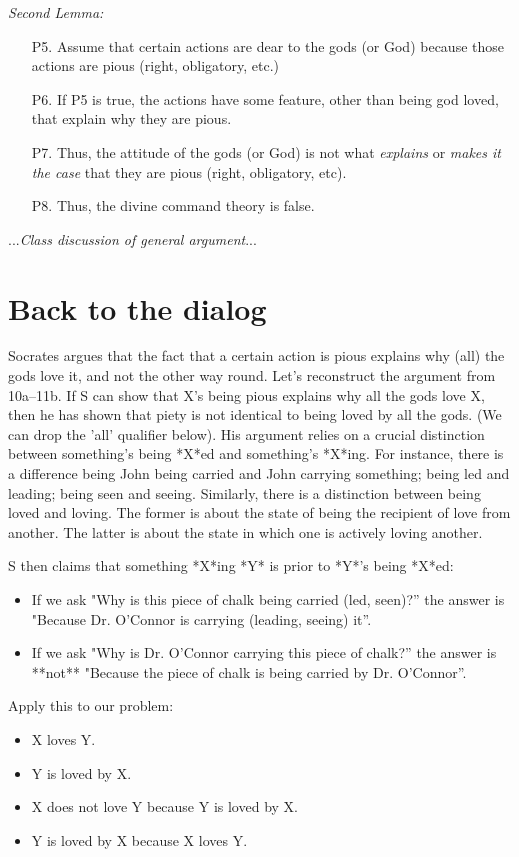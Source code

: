 \documentclass[oneside]{article}
\begin{document}
\begin{description}
\noindent \emph{Second Lemma:}
\begin{enumerate}
\item[P5.] Assume that certain actions are dear to the gods (or God) because those actions are pious (right, obligatory, etc.)
\item[P6.] If P5 is true, the actions have some feature, other than being god loved, that explain why they are pious. 
\item[P7.] Thus,  the attitude of the gods (or God) is not what \emph{explains} or \emph{makes it the case} that they are pious (right, obligatory, etc).
\item[P8.] Thus, the divine command theory is false.
\end{enumerate}
\noindent ...\emph{Class discussion of general argument}...

\section*{Back to the dialog}
\noindent Socrates argues that the fact that a certain action is pious explains why (all) the gods love it, and not the other way round. Let's reconstruct the argument from 10a--11b. If S can show that X's being pious explains why all the gods love X, then he has shown that piety is not identical to being loved by all the gods. (We can drop the 'all' qualifier below). His argument relies on a crucial distinction between something's being *X*ed and something's *X*ing. For instance, there is a difference being John being carried and John carrying something; being led and leading; being seen and seeing. Similarly, there is a distinction between being loved and loving. The former is about the state of being the recipient of love from another. The latter is about the state in which one is actively loving another.

S then claims that something *X*ing *Y* is prior to *Y*'s being *X*ed:
\begin{itemize}
\item If we ask "Why is this piece of chalk being carried (led, seen)?'' the answer is "Because Dr. O'Connor is carrying (leading, seeing) it''.
\item If we ask "Why is Dr.  O'Connor carrying this piece of chalk?'' the answer is **not** "Because the piece of chalk is being carried by Dr. O'Connor''.
\end{itemize}

Apply this to our problem: 

\begin{itemize}
\item X loves Y.
\item Y is loved by X. 
\item X does not love Y because Y is loved by X.
\item Y is loved by X because X loves Y.
\end{itemize}


\end{description}
\end{document}
